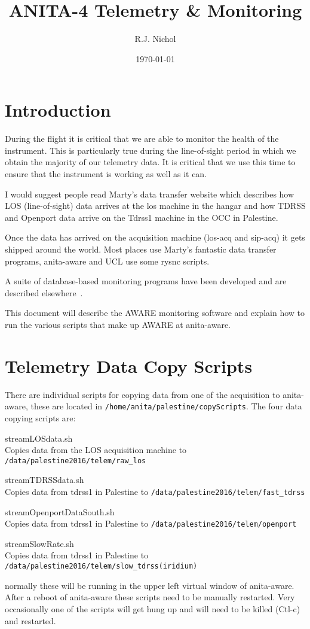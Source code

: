 \documentclass{article}
\begin{document}
\title{ANITA-4 Telemetry \& Monitoring}
\author{R.J. Nichol}
  
\date{\today}
\maketitle


\section{Introduction}
During the flight it is critical that we are able to monitor the health of the instrument. This is particularly true during the line-of-sight period in which we obtain the majority of our telemetry data. It is critical that we use this time to ensure that the instrument is working as well as it can.

I would suggest people read Marty's data transfer website which describes how LOS (line-of-sight) data arrives at the los machine in the hangar and how TDRSS and Openport data arrive on the Tdrss1 machine in the OCC in Palestine\cite{web:martyDataTransfer}.

Once the data has arrived on the acquisition machine (los-acq and sip-acq) it gets shipped around the world. Most places use Marty's fantastic data transfer programs, anita-aware and UCL use some rysnc scripts.

A suite of database-based monitoring programs have been developed and are described elsewhere~\cite{web:anitaMonitoring}.

This document will describe the AWARE monitoring software and explain how to run the various scripts that make up AWARE at anita-aware.

\section{Telemetry Data Copy Scripts}
There are individual scripts for copying data from one of the acquisition to anita-aware, these are located in {\tt  /home/anita/palestine/copyScripts}. The four data copying scripts are:
\begin{description}
\item{streamLOSdata.sh} \\Copies data from the LOS acquisition machine to {\tt /data/palestine2016/telem/raw\_los}
\item{streamTDRSSdata.sh} \\Copies data from tdrss1 in Palestine to {\tt /data/palestine2016/telem/fast\_tdrss}
\item{streamOpenportDataSouth.sh} \\Copies data from tdrss1 in Palestine to {\tt /data/palestine2016/telem/openport}
\item{streamSlowRate.sh} \\Copies data from tdrss1 in Palestine to {\tt /data/palestine2016/telem/slow\_tdrss(iridium)}
\end{description}
normally these will be running in the upper left virtual window of anita-aware. After a reboot of anita-aware these scripts need to be manually restarted. Very occasionally one of the scripts will get hung up and will need to be killed (Ctl-c) and restarted.
\end{document}

